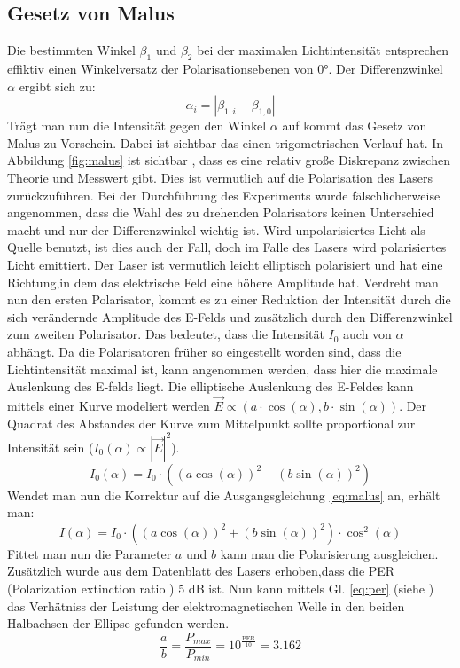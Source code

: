 \subsection{Gesetz von Malus}
Die bestimmten Winkel $\beta_1$ und $\beta_2$ bei der maximalen Lichtintensität entsprechen effiktiv einen Winkelversatz der Polarisationsebenen von 0°.
Der Differenzwinkel $\alpha$ ergibt sich zu:
\begin{equation}
    \alpha_i = |\beta_{1,i}- \beta_{1,0}|
\end{equation}
Trägt man nun die Intensität gegen den Winkel $\alpha$ auf kommt das Gesetz von Malus zu Vorschein. Dabei ist sichtbar das einen trigometrischen Verlauf hat.
In Abbildung \ref{fig:malus} ist sichtbar , dass es eine relativ große Diskrepanz zwischen Theorie und Messwert gibt. 
Dies ist vermutlich auf die Polarisation des Lasers zurückzuführen.
Bei der Durchführung des Experiments wurde fälschlicherweise angenommen, dass die Wahl des zu drehenden Polarisators keinen Unterschied macht und nur der Differenzwinkel wichtig ist.
Wird unpolarisiertes Licht als Quelle benutzt, ist dies auch der Fall, doch im Falle des Lasers wird polarisiertes Licht emittiert.
Der Laser ist vermutlich leicht elliptisch polarisiert und hat eine Richtung,in dem das elektrische Feld eine höhere Amplitude hat.
Verdreht man nun den ersten Polarisator, kommt es zu einer Reduktion der Intensität durch die sich verändernde Amplitude des E-Felds und zusätzlich durch den Differenzwinkel zum zweiten Polarisator.
Das bedeutet, dass die Intensität $I_0$ auch von $\alpha$ abhängt.
Da die Polarisatoren früher so eingestellt worden sind, dass die Lichtintensität maximal ist, kann angenommen werden, dass hier die maximale Auslenkung des E-felds liegt.
Die elliptische Auslenkung des E-Feldes kann mittels einer Kurve modeliert werden $\vec{E} \propto  (a \cdot \cos(\alpha), b \cdot \sin(\alpha) )$.
Der Quadrat des Abstandes der Kurve zum Mittelpunkt sollte proportional zur Intensität sein ($I_0(\alpha) \propto |\vec{E}|^2$).
\begin{equation}
    I_0(\alpha) = I_0 \cdot ((a\cos(\alpha))^2 + (b\sin(\alpha))^2)
\end{equation}
Wendet man nun die Korrektur auf die Ausgangsgleichung \ref{eq:malus} an, erhält man:
\begin{equation}
    I(\alpha) = I_0 \cdot ((a\cos(\alpha))^2 + (b\sin(\alpha))^2)\cdot \cos^2(\alpha)
\end{equation}
Fittet man nun die Parameter $a$ und $b$ kann man die Polarisierung ausgleichen.
Zusätzlich wurde aus dem Datenblatt des Lasers erhoben,dass die PER (Polarization extinction ratio ) 5 dB ist.
Nun kann mittels Gl. \ref{eq:per}  (siehe \cite{PER}) das Verhätniss der Leistung der elektromagnetischen Welle in den beiden Halbachsen der Ellipse gefunden werden.
\begin{equation}
    \frac{a}{b} = \frac{P_{max}}{P_{min}} = 10^{\frac{\text{PER}}{10}} = 3.162
    \label{eq:per}
\end{equation}

